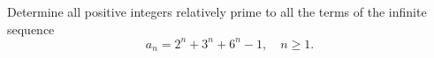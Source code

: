 Determine all positive integers relatively
prime to all the terms of the infinite sequence
\[ a_n = 2^n+3^n+6^n-1, \quad n \ge 1. \]
